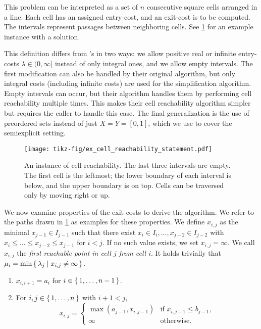 This problem can be interpreted as a set of \(n\) consecutive square cells arranged in a line. Each cell has an assigned entry-cost, and an exit-cost is to be computed. The intervals represent passages between neighboring cells. See \cref{fig:ex_cell_reachability_statement} for an example instance with a solution.

This definition differs from \citeauthor{polyline_simplification_has_cubic_complexity_bringmannetal}'s in two ways: we allow positive real or infinite entry-costs \(\lambda \in (0, \infty]\) instead of only integral ones, and we allow empty intervals. The first modification can also be handled by their original algorithm, but only integral costs (including infinite costs) are used for the simplification algorithm. Empty intervals can occur, but their algorithm handles them by performing cell reachability multiple times. This makes their cell reachability algorithm simpler but requires the caller to handle this case. The final generalization is the use of preordered sets instead of just \(X = Y = [0, 1]\), which we use to cover the semiexplicit setting.

\begin{figure}[htb]
  \centering
  \texttt{[image: tikz-fig/ex\_cell\_reachability\_statement.pdf]}
  \caption{An instance of cell reachability. The last three intervals are empty. The first cell is the leftmost; the lower boundary of each interval is below, and the upper boundary is on top. Cells can be traversed only by moving right or up.}
  \label{fig:ex_cell_reachability_statement}
\end{figure}

We now examine properties of the exit-costs to derive the algorithm. We refer to the paths drawn in \cref{fig:ex_cell_reachability_statement} as examples for these properties. We define \(x_{i, j}\) as the minimal \(x_{j-1} \in I_{j-1}\) such that there exist \(x_i \in I_i, \dots, x_{j-2} \in I_{j-2}\) with \(x_i \leq \dots \leq x_{j-2} \leq x_{j-1}\) for \(i < j\). If no such value exists, we set \(x_{i, j} = \infty\). We call \(x_{i,j}\) the \emph{first reachable point in cell \(j\) from cell \(i\)}. It holds trivially that \(\mu_i = \min \set{\lambda_j \mid x_{i, j} \neq \infty}\).

\begin{observation}\label{obs:recursive_x}
  \begin{enumerate}
		\item \(x_{i, i+1} = a_i\) for \(i \in \set{1, \dots, n - 1}\).
		\item For \(i, j \in \set{1, \dots, n}\) with \(i + 1 < j\),
			\[x_{i, j} =
			\begin{cases}
				\max(a_{j-1}, x_{i, j - 1}) & \textrm{if } x_{i, j-1} \leq b_{j-1},\\
				\infty &\textrm{otherwise}.
			\end{cases}\]
  \end{enumerate}
\end{observation}

